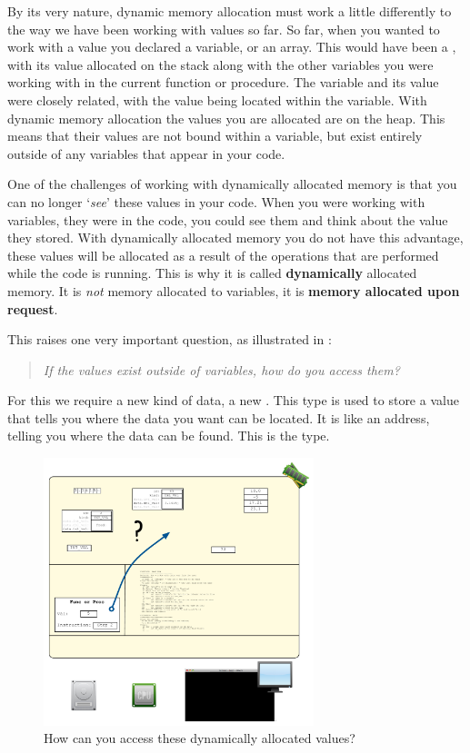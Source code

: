 By its very nature, dynamic memory allocation must work a little differently to the way we have been working with values so far. So far, when you wanted to work with a value you declared a variable, or an array. This would have been a , with its value allocated on the stack along with the other variables you were working with in the current function or procedure. The variable and its value were closely related, with the value being located within the variable. With dynamic memory allocation the values you are allocated are on the heap. This means that their values are not bound within a variable, but exist entirely outside of any variables that appear in your code.

One of the challenges of working with dynamically allocated memory is that you can no longer `\emph{see}' these values in your code. When you were working with variables, they were in the code, you could see them and think about the value they stored. With dynamically allocated memory you do not have this advantage, these values will be allocated as a result of the operations that are performed while the code is running. This is why it is called \textbf{dynamically} allocated memory. It is \emph{not} memory allocated to variables, it is \textbf{memory allocated upon request}.

This raises one very important question, as illustrated in :
\begin{quote}
  \emph{If the values exist outside of variables, how do you access them?}
\end{quote}
For this we require a new kind of data, a new . This type is used to store a value that tells you where the data you want can be located. It is like an address, telling you where the data can be found. This is the  type.

\begin{figure}[h]
   \centering
   \includegraphics[width=0.7\textwidth]{./topics/dynamic-memory/diagrams/HeapAccess} 
   \caption{How can you access these dynamically allocated values?}
   \label{fig:heap-access}
\end{figure}





